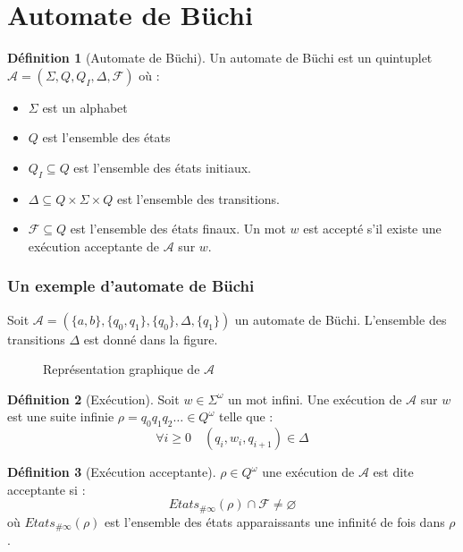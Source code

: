 \documentclass{beamer}
\theoremstyle{plain}
\theoremstyle{definition}
\newtheorem{defi}{Définition}
\begin{document}
\section{Automate de Büchi}
\begin{frame}
  \begin{defi}[Automate de Büchi]
    Un automate de Büchi est un quintuplet $\mathcal{A}=(\Sigma, Q, Q_I, \Delta, \mathscr{F})$ où :
    \begin{itemize}
    \item $\Sigma$ est un alphabet
    \item $Q$ est l'ensemble des états
    \item $Q_I \subseteq Q$ est l'ensemble des états initiaux.
    \item $\Delta \subseteq Q \times \Sigma \times Q$ est l'ensemble des transitions.
    \item $\mathscr{F} \subseteq Q$ est l'ensemble des états finaux.
      Un mot $w$ est accepté s'il existe une exécution acceptante de $\mathcal{A}$ sur $w$.
    \end{itemize}
  \end{defi}
\end{frame}

\begin{frame}
  \frametitle{Un exemple d'automate de Büchi}

  Soit $\mathcal{A}=(\{a,b\}, \{q_0, q_1\}, \{q_0\}, \Delta, \{q_1\})$ un automate de Büchi.
  L'ensemble des transitions $\Delta$ est donné dans la figure.
  \begin{figure}
    \centering
    \caption{Représentation graphique de $\mathcal{A}$}
  \end{figure}
\end{frame}


\begin{frame}[<+->]
  \begin{defi}[Exécution]
    Soit $w \in \Sigma^\omega$ un mot infini.
    Une exécution de $\mathcal{A}$ sur $w$ est une suite infinie $\rho = q_0q_1q_2\dots \in Q^\omega$ telle que :
    \[
      \forall i \geq 0 \quad (q_i, w_i, q_{i+1}) \in \Delta
    \]
  \end{defi}
  
  \begin{defi}[Exécution acceptante]
    $\rho \in Q^\omega$ une exécution de $\mathcal{A}$ est dite acceptante si :
    \[
      Etats_{\#\infty}(\rho) \cap \mathscr{F} \neq \varnothing
    \]
    où $Etats_{\#\infty}(\rho)$ est l'ensemble des états apparaissants une infinité de fois dans $\rho$.
  \end{defi}
\end{frame}
\end{document}
